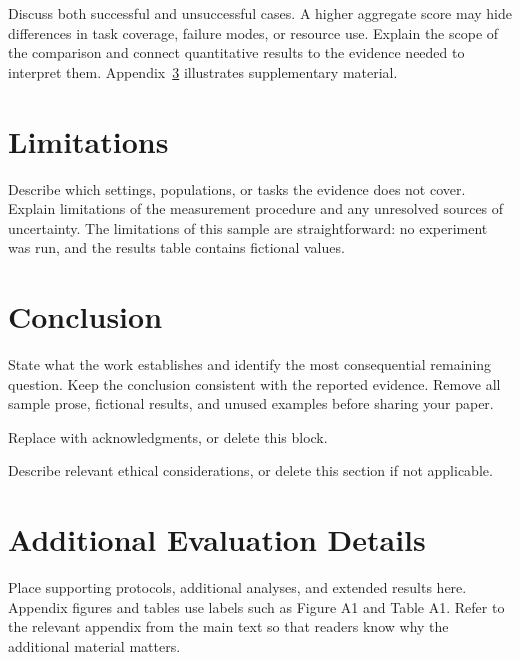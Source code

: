 \documentclass[11pt,a4paper]{article}
\begin{document}
Discuss both successful and unsuccessful cases. A higher aggregate score may
hide differences in task coverage, failure modes, or resource use. Explain the
scope of the comparison and connect quantitative results to the evidence needed
to interpret them. Appendix~\ref{app:details} illustrates supplementary material.

\section{Limitations}
Describe which settings, populations, or tasks the evidence does not cover.
Explain limitations of the measurement procedure and any unresolved sources of
uncertainty. The limitations of this sample are straightforward: no experiment
was run, and the results table contains fictional values.

\section{Conclusion}
State what the work establishes and identify the most consequential remaining
question. Keep the conclusion consistent with the reported evidence. Remove all
sample prose, fictional results, and unused examples before sharing your paper.

\begin{aespubliconly}
Replace with acknowledgments, or delete this block.
\end{aespubliconly}

Describe relevant ethical considerations, or delete this section if not applicable.



\appendix
\section{Additional Evaluation Details}
\label{app:details}
Place supporting protocols, additional analyses, and extended results here.
Appendix figures and tables use labels such as Figure A1 and Table A1.
Refer to the relevant appendix from the main text so that readers know why the
additional material matters.
\end{document}
